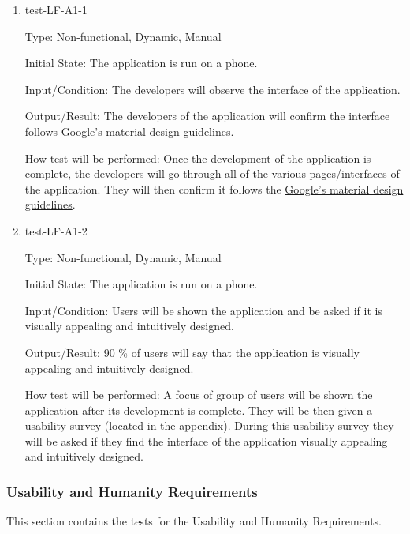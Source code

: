 \documentclass[12pt, titlepage]{article}
\begin{document}
\begin{enumerate}

\item{test-LF-A1-1\\}

Type: Non-functional, Dynamic, Manual 
					
Initial State: The application is run on a phone.
					
Input/Condition: The developers will observe the interface of the application. 
					
Output/Result: The developers of the application will confirm the interface follows \href{https://m3.material.io/foundations}{Google's material design guidelines}. 
					
How test will be performed: Once the development of the application is complete, the developers will go through all of the various pages/interfaces of the application. They will then confirm it follows the \href{https://m3.material.io/foundations}{Google's material design guidelines}.

\item{test-LF-A1-2\\}

Type: Non-functional, Dynamic, Manual 
					
Initial State: The application is run on a phone.
					
Input/Condition: Users will be shown the  application and be asked if it is visually appealing and intuitively designed. 
					
Output/Result: 90 \% of users will say that the application is visually appealing and intuitively designed. 
					
How test will be performed: A focus of group of users will be shown the application after its development is complete. They will be then given a usability survey (located in the appendix). During this usability survey they will be asked if they find the interface of the application visually appealing and intuitively designed.
					

\end{enumerate}

\subsubsection{Usability and Humanity Requirements}

This section contains the tests for the Usability and Humanity Requirements.
		
\end{document}
